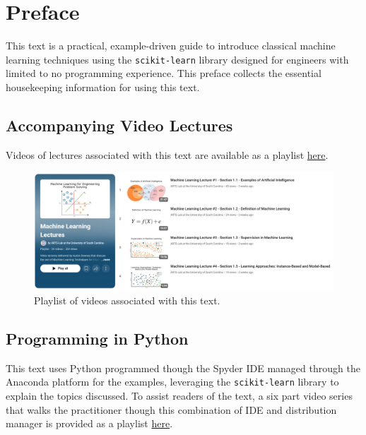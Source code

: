 \documentclass[12pt,letter]{article}
\begin{document}
\pagebreak

\pagebreak
\setcounter{page}{1}
\tableofcontents

\pagebreak

\setcounter{secnumdepth}{0} %
\setcounter{page}{1}

\section{Preface}
\vspace{-1ex}
This text is a practical, example-driven guide to introduce classical machine learning techniques using the {\tt{scikit-learn}} library designed for engineers with limited to no programming experience. This preface collects the essential housekeeping information for using this text.



\vspace{-0.5ex}
\subsection{Accompanying Video Lectures}
\vspace{-1ex}
Videos of lectures associated with this text are available as a playlist 
\href{https://www.youtube.com/playlist?list=PL-2wJog-EC5-yp3CSFpj2vEcj3Pp6UcoC}{here}.

\begin{figure}[H]
	\centering
	\includegraphics[width=6.0in]{figures/video_playlist}
	\vspace{-0.5ex}
	\caption{Playlist of videos associated with this text.}
	\label{fig:video_playlist}
	\vspace{-1.5ex}
\end{figure} 

\vspace{-0.5ex}
\subsection{Programming in Python}
\vspace{-1ex}
This text uses Python programmed though the Spyder IDE managed through the Anaconda platform for the examples, leveraging the {\tt{scikit-learn}} library to explain the topics discussed. To assist readers of the text, a six part video series that walks the practitioner though this combination of IDE and distribution manager is provided as a playlist  \href{https://www.youtube.com/playlist?list=PL-2wJog-EC5-wQQUdpc8MjztKZ1kE2ATS}{here}.
\end{document}
